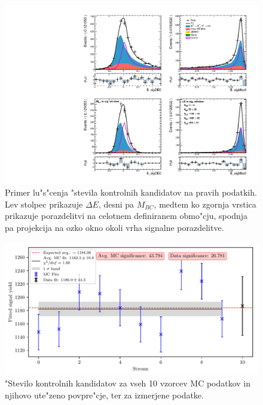 \begin{otherlanguage}{slovene}
\begin{figure}[H]
	\centering
	\captionsetup{width=0.8\linewidth}
	\includegraphics[width=\linewidth]{fig/cs_fit_data}
	\caption{Primer lu"s"cenja "stevila kontrolnih kandidatov na pravih podatkih. Lev stolpec prikazuje $\Delta E$, desni pa $M_{BC}$, medtem ko zgornja vrstica prikazuje porazdelitvi na celotnem definiranem obmo"cju, spodnja pa projekcija na ozko okno okoli vrha signalne porazdelitve.}
	\label{fig:cs_fit_data_si}
\end{figure}

\begin{figure}[H]
	\centering
	\captionsetup{width=0.8\linewidth}
	\includegraphics[width=\linewidth]{fig/cs_global}
	\caption{"Stevilo kontrolnih kandidatov za vseh 10 vzorcev MC podatkov in njihovo ute"zeno povpre"cje, ter za izmerjene podatke.}
	\label{fig:cs_global_si}
\end{figure}


\end{otherlanguage}
